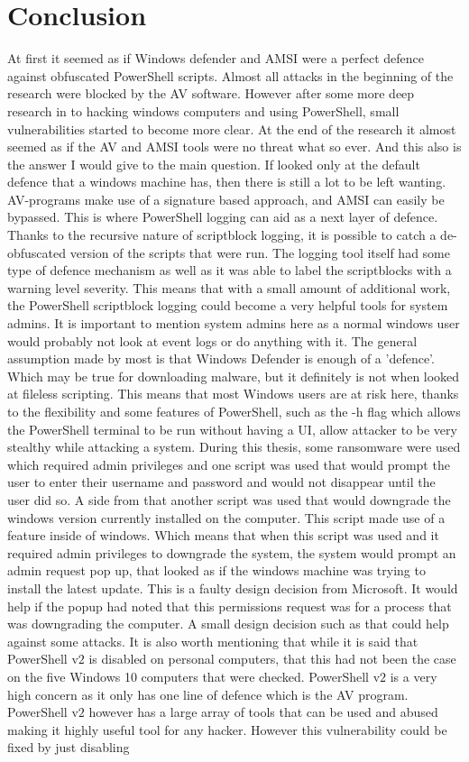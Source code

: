 \documentclass{article}%
\begin{document}
\section{Conclusion}
At first it seemed as if Windows defender and AMSI were a perfect defence against obfuscated PowerShell scripts. Almost all attacks in the beginning of the research were blocked by the AV software. However after some more deep research in to hacking windows computers and using PowerShell, small vulnerabilities started to become more clear. At the end of the research it almost seemed as if the AV and AMSI tools were no threat what so ever. And this also is the answer I would give to the main question. If looked only at the default defence that a windows machine has, then there is still a lot to be left wanting. AV-programs make use of a signature based approach, and AMSI can easily be bypassed. This is where PowerShell logging can aid as a next layer of defence. Thanks to the recursive nature of scriptblock logging, it is possible to catch a de-obfuscated version of the scripts that were run. The logging tool itself had some type of defence mechanism as well as it was able to label the scriptblocks with a warning level severity. This means that with a small amount of additional work, the PowerShell scriptblock logging could become a very helpful tools for system admins. It is important to mention system admins here as a normal windows user would probably not look at event logs or do anything with it. The general assumption made by most is that Windows Defender is enough of a 'defence'. Which may be true for downloading malware, but it definitely is not when looked at fileless scripting. This means that most Windows users are at risk here, thanks to the flexibility and some features of PowerShell, such as the -h flag which allows the PowerShell terminal to be run without having a UI, allow attacker to be very stealthy while attacking a system. During this thesis, some ransomware were used which required admin privileges and one script was used that would prompt the user to enter their username and password and would not disappear until the user did so. A side from that another script was used that would downgrade the windows version currently installed on the computer. This script made use of a feature inside of windows. Which means that when this script was used and it required admin privileges to downgrade the system, the system would prompt an admin request pop up, that looked as if the windows machine was trying to install the latest update. This is a faulty design decision from Microsoft. It would help if the popup had noted that this permissions request was for a process that was downgrading the computer. A small design decision such as that could help against some attacks. It is also worth mentioning that while it is said that PowerShell v$2$ is disabled on personal computers, that this had not been the case on the five Windows 10 computers that were checked. PowerShell v$2$ is a very high concern as it only has one line of defence which is the AV program. PowerShell v$2$ however has a large array of tools that can be used and abused making it highly useful tool for any hacker. However this vulnerability could be fixed by just disabling 
\end{document}
